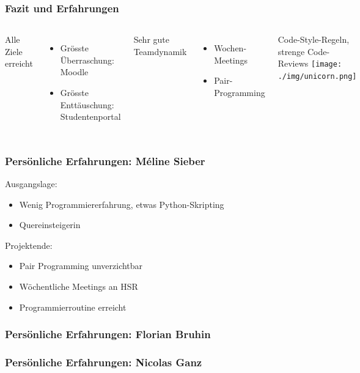 \documentclass{beamer}
\begin{document}
	\begin{frame}
		\frametitle{Fazit und Erfahrungen}
		\begin{columns}
			Alle Ziele erreicht
				\begin{itemize}
					    \item Grösste Überraschung: Moodle
					    \item Grösste Enttäuschung: Studentenportal
				\end{itemize}
			Sehr gute Teamdynamik
			\begin{itemize}
				\item Wochen-Meetings	
				\item Pair-Programming
			\end{itemize}
			Code-Style-Regeln, strenge Code-Reviews
			\texttt{[image: ./img/unicorn.png]}
		\end{columns}

	\end{frame}
	\begin{frame}
	  	\frametitle{Persönliche Erfahrungen: Méline Sieber}
	  	Ausgangslage: 
		\begin{itemize}
			\item Wenig Programmiererfahrung, etwas Python-Skripting
			\item Quereinsteigerin
		\end{itemize}
		\pause
		Projektende:
			\begin{itemize}
				\item Pair Programming unverzichtbar
				\item Wöchentliche Meetings an HSR
				\item Programmierroutine erreicht
			\end{itemize}
	\end{frame}
	
	\begin{frame}
	   	\frametitle{Persönliche Erfahrungen: Florian Bruhin}
	\end{frame}
	\begin{frame}
	    	\frametitle{Persönliche Erfahrungen: Nicolas Ganz}
	\end{frame}
	
\end{document}
